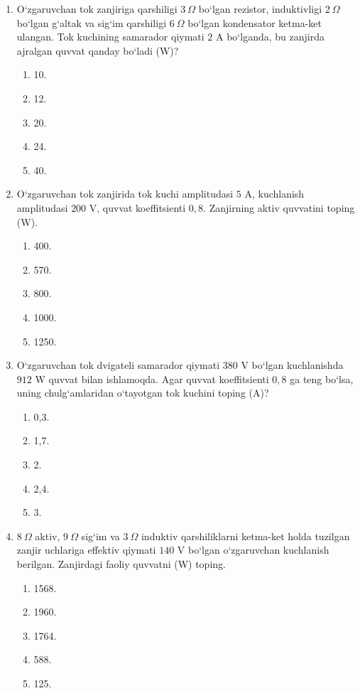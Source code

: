 \begin{enumerate}
\item O‘zgaruvchan tok zanjiriga qarshiligi $3~\Omega$ bo‘lgan rezistor, induktivligi $2~\Omega$ bo‘lgan g‘altak va sig‘im qarshiligi $6~\Omega$ bo‘lgan kondensator ketma-ket ulangan. Tok kuchining samarador qiymati $2$ A bo‘lganda, bu zanjirda ajralgan quvvat qanday bo‘ladi (W)?
\begin{enumerate}[label=\Alph*)]
\item 10.
\item 12.
\item 20.
\item 24.
\item 40.
\end{enumerate}

\item O‘zgaruvchan tok zanjirida tok kuchi amplitudasi $5$ A, kuchlanish amplitudasi $200$ V, quvvat koeffitsienti $0,8$. Zanjirning aktiv quvvatini toping (W).
\begin{enumerate}[label=\Alph*)]
\item 400.
\item 570.
\item 800.
\item 1000.
\item 1250.
\end{enumerate}

\item O‘zgaruvchan tok dvigateli samarador qiymati $380$ V bo‘lgan kuchlanishda $912$ W quvvat bilan ishlamoqda. Agar quvvat koeffitsienti $0,8$ ga teng bo‘lsa, uning chulg‘amlaridan o‘tayotgan tok kuchini toping (A)?
\begin{enumerate}[label=\Alph*)]
\item 0,3.
\item 1,7.
\item 2.
\item 2,4.
\item 3.
\end{enumerate}

\item $8~\Omega$ aktiv, $9~\Omega$ sig‘im va $3~\Omega$ induktiv qarshiliklarni ketma-ket holda tuzilgan zanjir uchlariga effektiv qiymati $140$ V bo‘lgan o‘zgaruvchan kuchlanish berilgan. Zanjirdagi faoliy quvvatni (W) toping.
\begin{enumerate}[label=\Alph*)]
\item 1568.
\item 1960.
\item 1764.
\item 588.
\item 125.
\end{enumerate}


\end{enumerate}

